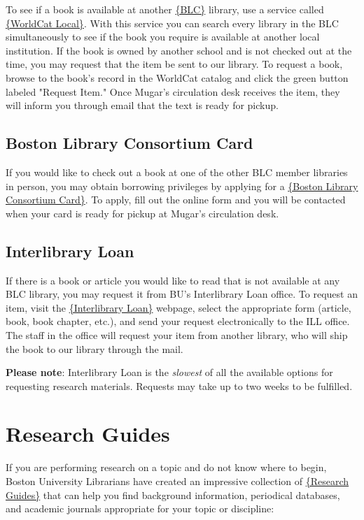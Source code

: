 {To see if a book is available at another 
\href{http://www.blc.org/members/current-members}{\{BLC\}} library, use a 
service called \href{http://www.bu.worldcat.org}{\{WorldCat Local\}}. With this 
service you can search every library in the BLC simultaneously to see if the 
book you require is available at another local institution. If the book is 
owned by another school and is not checked out at the time, you may request 
that the item be sent to our library. To request a book, browse to the book's 
record in the WorldCat catalog and click the green button labeled "Request 
Item." Once Mugar's circulation desk receives the item, they will inform you 
through email that the text is ready for pickup.

\subsection{Boston Library Consortium Card}
If you would like to check out a book at one of the other BLC member libraries 
in person, you may obtain borrowing privileges by applying for a 
\href{http://www.bu.edu/library/services/ill/blc-cards}{\{Boston Library 
Consortium Card\}}. To apply, fill out the online form and you will be 
contacted when your card is ready for pickup at Mugar's circulation desk.

\subsection{Interlibrary Loan}
If there is a book or article you would like to read that is not available at 
any BLC library, you may request it from BU's Interlibrary Loan office. To 
request an item, visit the 
\href{http://illiad.bu.edu/illiad/bos/illiad.dll}{\{Interlibrary Loan\}} 
webpage, select the appropriate form (article, book, book chapter, etc.), and 
send your request electronically to the ILL office. The staff in the office 
will request your item from another library, who will ship the book to our 
library through the mail. 

\textbf{Please note}: Interlibrary Loan is the \emph{slowest} of all the 
available options for requesting research materials. Requests may take up to 
two weeks to be fulfilled. 


\section{Research Guides}

If you are performing research on a topic and do not know where to begin, 
Boston University Librarians have created an impressive collection of 
\href{http://www.bu.edu/library/guides/index-a-h.html}{\{Research Guides\}} 
that can help you find background information, periodical databases, and 
academic journals appropriate for your topic or discipline:

}
